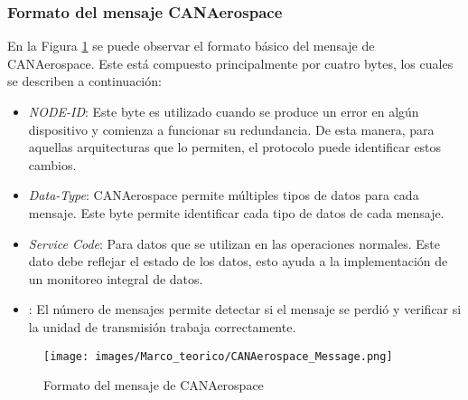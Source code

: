 \subsubsection{Formato del mensaje CANAerospace}
En la Figura \ref{fig:CANAerospaceMessage} se puede observar el formato
básico del mensaje de CANAerospace. Este está compuesto principalmente
por cuatro  bytes, los cuales se describen a continuación:
\begin{itemize}
\item \textit{NODE-ID}: Este byte es utilizado cuando se produce un error en algún
  dispositivo y comienza a funcionar su redundancia. De esta manera, para aquellas
  arquitecturas que lo permiten, el protocolo puede identificar estos cambios.
\item \textit{Data-Type}: CANAerospace permite múltiples tipos de datos para cada mensaje.
  Este byte permite identificar cada tipo de datos de cada mensaje.
\item \textit{Service Code}: Para datos que se utilizan en las operaciones
  normales. Este dato debe reflejar el estado de los datos, esto ayuda a la
  implementación de un monitoreo integral de datos.
\item {}: El número de mensajes permite detectar si el mensaje
  se perdió y verificar si la unidad de transmisión trabaja correctamente. 
\end{itemize}

\begin{figure}[h]
 \centering
 \texttt{[image: images/Marco\_teorico/CANAerospace\_Message.png]}
  \caption{Formato del mensaje de CANAerospace}
\label{fig:CANAerospaceMessage}
\end{figure}


